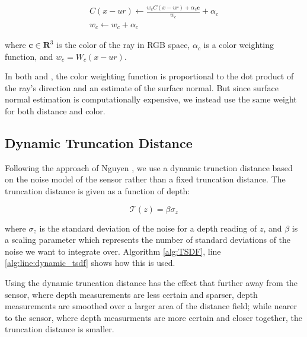 \documentclass[10pt,twocolumn,letterpaper]{article}
\begin{document}
\begin{align}
C(x - ur) \gets \frac{w_c C(x - ur) + \alpha_c \mathbf{c}}{w_c}
+\alpha_c
\\
%
w_c \gets w_c + \alpha_c
\end{align}

\noindent where $\mathbf{c} \in \mathbf{R}^3$ is the color of the ray in RGB
space, $\alpha_c$ is a color weighting function, and $w_c = W_c(x -
ur)$.

In both \cite{Bylow2013} and \cite{Whelan2013}, the color weighting function is
proportional to the dot product of the ray's direction and an estimate of the
surface normal. But since surface normal estimation is computationally
expensive, we instead use the same weight for both distance and color.


\subsection{Dynamic Truncation Distance}
Following the approach of Nguyen \etal\cite{Nguyen2012}, we use a dynamic
trunction distance based on the noise model of the sensor rather than a fixed
truncation distance. The truncation distance is given as a function of depth:

\begin{equation} \mathcal{T} (z) = \beta\sigma_{z} \end{equation}

\noindent where $\sigma_{z}$ is the standard deviation of the noise for a depth
reading of $z$, and $\beta$ is a scaling parameter which represents the number of
standard deviations of the noise we want to integrate over. Algorithm
\ref{alg:TSDF}, line \ref{alg:line:dynamic_tsdf} shows how this is used.

Using the dynamic truncation distance has the effect that further away from the
sensor, where depth measurements are less certain and sparser, depth
measurements are smoothed over a larger area of the distance field; while nearer
to the sensor, where depth measurments are more certain and closer together, the
truncation distance is smaller.
\end{document}
